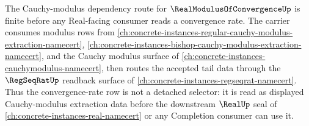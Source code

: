 The Cauchy-modulus dependency route for $\RealModulusOfConvergenceUp$ is finite before any Real-facing consumer reads a convergence rate. The carrier consumes modulus rows from \autoref{ch:concrete-instances-regular-cauchy-modulus-extraction-namecert}, \autoref{ch:concrete-instances-bishop-cauchy-modulus-extraction-namecert}, and the Cauchy modulus surface of \autoref{ch:concrete-instances-cauchymodulus-namecert}, then routes the accepted tail data through the $\RegSeqRatUp$ readback surface of \autoref{ch:concrete-instances-regseqrat-namecert}. Thus the convergence-rate row is not a detached selector: it is read as displayed Cauchy-modulus extraction data before the downstream $\RealUp$ seal of \autoref{ch:concrete-instances-real-namecert} or any Completion consumer can use it.
